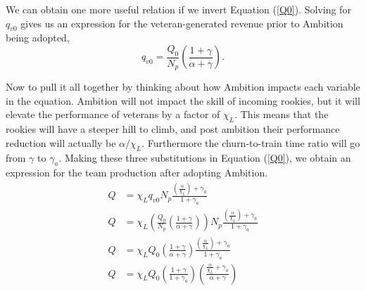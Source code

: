 \documentclass[paper=a4, fontsize=11pt abstract]{scrartcl}
\numberwithin{equation}{section}		%
\numberwithin{figure}{section}			%
\numberwithin{table}{section}				%
\begin{document}
We can obtain one more useful relation if we invert Equation (\ref{Q0}).  Solving for $q_{v0}$ gives us an expression for the veteran-generated revenue prior to Ambition being adopted,
\begin{equation}
    q_{v0} = \frac{Q_0}{N_p}\left(\frac{1 + \gamma}{\alpha + \gamma}\right).
\end{equation}

Now to pull it all together by thinking about how Ambition impacts each variable in the equation.  Ambition will not impact the skill of incoming rookies, but it will elevate the performance of veterans by a factor of $\chi_L$.  This means that the rookies will have a steeper hill to climb, and post ambition their performance reduction will actually be $\alpha / \chi_L$.  Furthermore the churn-to-train time ratio will go from $\gamma$ to $\gamma_a$.  Making these three substitutions in Equation (\ref{Q0}), we obtain an expression for the team production after adopting Ambition.
\begin{align}
    Q &= \chi_L q_{v0} N_p \frac{\left(\frac{\alpha}{\chi_L}\right) + \gamma_a}{1 + \gamma_a} \\
    Q &= \chi_L \left(     \frac{Q_0}{N_p}\left(\frac{1 + \gamma}{\alpha + \gamma}\right)             \right) N_p \frac{\left(\frac{\alpha}{\chi_L}\right) + \gamma_a}{1 + \gamma_a} \\
    Q &= \chi_L Q_0  \left(\frac{1 + \gamma}{\alpha + \gamma}  \right)  \frac{\left(\frac{\alpha}{\chi_L}\right) + \gamma_a}{1 + \gamma_a} \\
    Q &= \chi_L Q_0  \left(\frac{1+\gamma}{1 + \gamma_a}\right) \left(\frac{\frac{\alpha}{\chi_L} + \gamma_a  }{\alpha + \gamma}\right)
\end{align}


\end{document}
